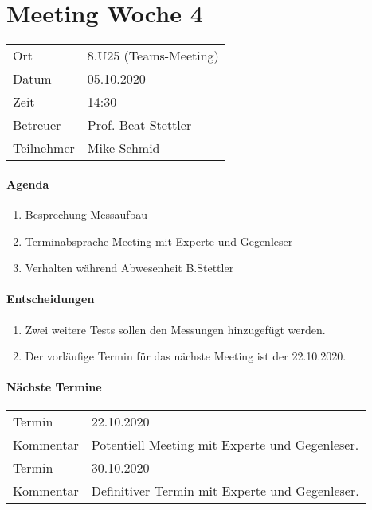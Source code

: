 \section*{Meeting Woche 4}

\begin{table}[h!]
	\begin{tabularx}{\textwidth}{l X }
		Ort & 8.U25 (Teams-Meeting) \\
		Datum & 05.10.2020 \\
		Zeit & 14:30 \\
		Betreuer & Prof. Beat Stettler\\
		Teilnehmer & Mike Schmid \\
	\end{tabularx}
\end{table}

\paragraph{Agenda}
\begin{enumerate}
	\item Besprechung Messaufbau
	\item Terminabsprache Meeting mit Experte und Gegenleser
	\item Verhalten während Abwesenheit B.Stettler
\end{enumerate}

\paragraph{Entscheidungen}
\begin{enumerate}
	\item Zwei weitere Tests sollen den Messungen hinzugefügt werden.
	\item Der vorläufige Termin für das nächste Meeting ist der 22.10.2020.
\end{enumerate}

\paragraph{Nächste Termine} \hfill
\begin{table}[h!]
	\begin{tabularx}{\textwidth}{l X }
		Termin & 22.10.2020 \\
		Kommentar & Potentiell Meeting mit Experte und Gegenleser. \\
		Termin & 30.10.2020 \\
		Kommentar & Definitiver Termin mit Experte und Gegenleser. \\
	\end{tabularx}
\end{table}

\clearpage